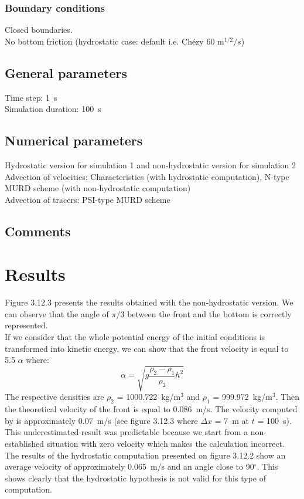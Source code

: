 \subsubsection{Boundary conditions}
%
Closed boundaries.\\
No bottom friction (hydrostatic case: default i.e. Chézy 60 m$^{1/2}/s$)
%
\subsection{General parameters}
%
Time step: 1~s\\
Simulation duration: 100~s
%
%
%
\subsection{Numerical parameters}
%
Hydrostatic version for simulation 1 and non-hydrostatic version for
simulation 2\\
Advection of velocities: Characteristics (with hydrostatic computation),
N-type MURD scheme (with non-hydrostatic computation)\\
Advection of tracers: PSI-type MURD scheme
%
\subsection{Comments}
%
%
%
\section{Results}
%
Figure 3.12.3 presents the results obtained with the non-hydrostatic
version.
We can observe that the angle of $\pi/3$ between the front and the
bottom is correctly represented.\\
If we consider that the whole potential energy of the initial conditions
is transformed into kinetic energy, we can show that the front velocity
is equal to 5.5 $\alpha$ where:
\begin{equation}
\alpha = \sqrt{g \frac{\rho_2-\rho_1}{\rho_2}h^2}
\end{equation}
The respective densities are $\rho_2$ = 1000.722~kg/m$^3$
and $\rho_1$ = 999.972~kg/m$^3$.
Then the theoretical velocity of the front is equal to 0.086~m/s.
The velocity computed by  is approximately 0.07~m/s
(see figure 3.12.3 where $\Delta x$ = 7~m at $t$ = 100~s).
This underestimated result was predictable because we start from a
non-established situation with zero velocity which makes the calculation
incorrect.\\
The results of the hydrostatic computation presented on figure 3.12.2
show an average velocity of approximately 0.065~m/s and an angle close
to 90$^\circ$.
This shows clearly that the hydrostatic hypothesis is not valid for
this type of computation.
%
